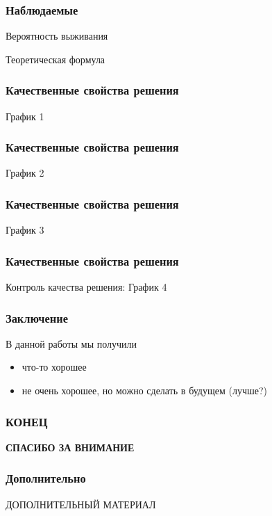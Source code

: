 \documentclass[utf8,9pt,mathserif,usepdftitle=false]{beamer}
\begin{document}
\begin{frame}
  \frametitle{Наблюдаемые}%
  Вероятность выживания

  Теоретическая формула
\end{frame}

\begin{frame}
  \frametitle{Качественные свойства решения}%
  График 1
\end{frame}

\begin{frame}
  \frametitle{Качественные свойства решения}%
  График 2
\end{frame}

\begin{frame}
  \frametitle{Качественные свойства решения}%
  График 3
\end{frame}

\begin{frame}
  \frametitle{Качественные свойства решения}%
  Контроль качества решения:
  График 4
\end{frame}

\begin{frame}
  \frametitle{Заключение}%
  В данной работы мы получили
  \begin{itemize}
  \item<1-> что-то хорошее
  \item<2-> не очень хорошее, но можно сделать в будущем (лучше?)
  \end{itemize}
\end{frame}

\begin{frame}
  \frametitle{КОНЕЦ}%
  \LARGE%
  \centering%
  \bfseries%
  СПАСИБО ЗА ВНИМАНИЕ%
\end{frame}

\begin{frame}
  \frametitle{Дополнительно}%
  \centering%
  ДОПОЛНИТЕЛЬНЫЙ МАТЕРИАЛ
\end{frame}
\end{document}
